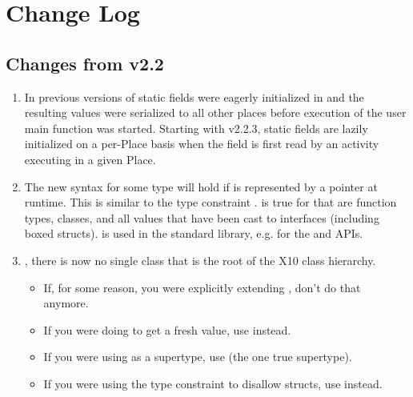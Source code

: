 \chapter{Change Log}

\section{Changes from \Xten{} v2.2}

\begin{enumerate}

\item In previous versions of \Xten{} static fields were
  eagerly initialized in  and the resulting values were
  serialized to all other places before execution of the user main
  function was started. Starting with \Xten{} v2.2.3, static fields are
  lazily initialized on a per-Place basis when the field is first read
  by an activity executing in a given Place.

\item The new syntax  for some type  will hold if
   is represented by a pointer at runtime.  This is similar to
  the type constraint .   is true for
   that are function types, classes, and all values that have
  been cast to interfaces (including boxed structs).   is used
  in the standard library, e.g. for the  and
   APIs.

\item {}, there is now no single class that
  is the root of the X10 class hierarchy.
\begin{itemize}
  \item If, for some reason, you were explicitly extending , don't do
    that anymore.
  \item If you were doing  to get a fresh value, use
     instead.
  \item If you were using  as a supertype, use 
    (the one true supertype).  
  \item If you were using the type constraint  to
    disallow structs, use  instead.
\end{itemize}


\end{enumerate}
